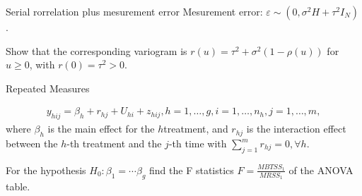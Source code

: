\documentclass[UTF8,a4paper,10pt]{article}
\begin{document}
          
  \begin{Problem}[]{Serial rorrelation plus mesurement error}
    Mesurement error: \(\varepsilon \sim (0,\sigma^2 H+\tau^2I_N)\).

    Show that the corresponding variogram is \(r(u) = \tau^2+\sigma^2(1-\rho(u))\) for \(u\geq 0\), with \(r(0) = \tau^2>0\).

    
      \end{Problem} 


  \begin{Problem}[]{Repeated Measures}

    \begin{equation*}
      \begin{aligned}
        y_{hij} = \beta_{h}+r_{hj}+ U_{hi}+z_{hij}, h = 1,\ldots,g, i=1,\ldots,n_h, j=1,\ldots,m,
      \end{aligned}
    \end{equation*}
    where \(\beta_h\) is the main effect for the \(h\)\th treatment, and \(r_{hj}\) is the interaction effect between the \(h\)-th treatment and the \(j\)-th time with \(\sum_{j=1}^{m}r_{hj} = 0 ,\forall h\).

    For the hypothesis \(H_0:\beta_1 = \cdots\beta_g\)
find the F statistics \(F = \frac{MBTSS_1}{MRSS_1}\) of the ANOVA table.

    
  \end{Problem} 

  
  \begin{solution}\,\\


  \end{solution}
    
\end{document}
